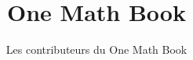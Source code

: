 \documentclass[11pt,a4paper,twoside,openany]{book}
\title{One Math Book}
\author{Les contributeurs du One Math Book}
\date{\bookdate}
\begin{document}
\frontmatter



\tableofcontents

\mainmatter





\appendix
\part{\omsolutionspart}




\backmatter
\printindex
\end{document}
